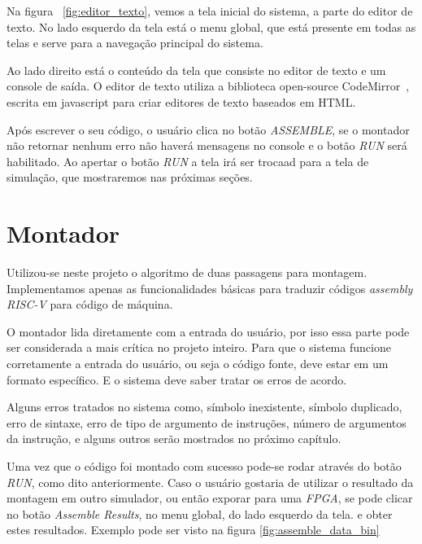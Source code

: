 	Na figura ~\ref{fig:editor_texto}, vemos a tela inicial do sistema, a parte do editor de texto. No lado esquerdo da tela está o menu global, que está presente em todas as telas e serve para a navegação principal do sistema.

	Ao lado direito está o conteúdo da tela que consiste no editor de texto e um console de saída. O editor de texto utiliza a biblioteca open-source CodeMirror~\cite{codemirror}, escrita em javascript para criar editores de texto baseados em HTML.

	Após escrever o seu código, o usuário clica no botão \textit{ASSEMBLE}, se o montador não retornar nenhum erro não haverá mensagens no console e o botão \textit{RUN} será habilitado. Ao apertar o botão \textit{RUN} a tela irá ser trocaad para a tela de simulação, que mostraremos nas próximas seções.

	
\section{Montador}
	
	Utilizou-se neste projeto o algoritmo de duas passagens para montagem. Implementamos apenas as funcionalidades básicas para traduzir códigos \textit{assembly RISC-V} para código de máquina.

	O montador lida diretamente com a entrada do usuário, por isso essa parte pode ser considerada a mais crítica no projeto inteiro. Para que o sistema funcione corretamente a entrada do usuário, ou seja o código fonte, deve estar em um formato específico. E o sistema deve saber tratar os erros de acordo. 

	Alguns erros tratados no sistema como, símbolo inexistente, símbolo duplicado, erro de sintaxe, erro de tipo de argumento de instruções, número de argumentos da instrução, e alguns outros serão mostrados no próximo capítulo.

	Uma vez que o código foi montado com sucesso pode-se rodar através do botão \textit{RUN}, como dito anteriormente. Caso o usuário gostaria de utilizar o resultado da montagem em outro simulador, ou então exporar para uma \textit{FPGA}, se pode clicar no botão \textit{Assemble Results}, no menu global, do lado esquerdo da tela. e obter estes resultados. Exemplo pode ser visto na figura \ref{fig:assemble_data_bin}


